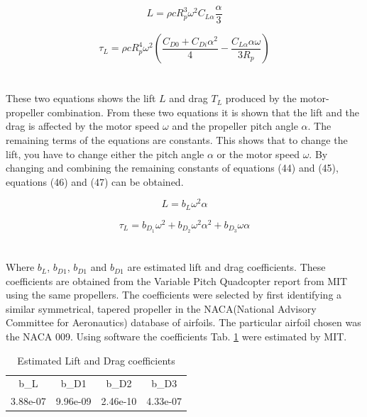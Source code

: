 \begin{equation}
    L = \rho cR_p^3\omega^2C_{L\alpha}\frac{\alpha}{3}
\end{equation}

\begin{equation}
    \tau_L =  \rho cR_p^4\omega^2\left(\frac{C_{D0} + C_{Di}\alpha^2}{4} - \frac{C_{L\alpha}\alpha\omega}{3R_p}\right)
\end{equation}
\\\\
These two equations shows the lift $L$ and drag $T_L$ produced by the motor-propeller combination. From these two equations it is shown that the lift and the drag is affected by the motor speed $\omega$ and the propeller pitch angle $\alpha$. The remaining terms of the equations are constants. This shows that to change the lift, you have to change either the pitch angle $\alpha$ or the motor speed $\omega$. By changing and combining the remaining constants of equations (44) and (45), equations (46) and (47) can be obtained. 

\begin{equation}
    L = b_L\omega^2\alpha
\end{equation}

\begin{equation}
    \tau_L = b_{D_1}\omega^2 + b_{D_2}\omega^2\alpha^2 + b_{D_3}\omega\alpha
\end{equation}
\\\\
Where $b_L$, $b_{D1}$, $b_{D1}$ and $b_{D1}$ are estimated lift and drag coefficients. These coefficients are obtained from the Variable Pitch Quadcopter report from MIT \cite{MITvpp} using the same propellers. The coefficients were selected by first identifying a similar symmetrical, tapered propeller in the NACA(National Advisory Committee for Aeronautics) database of airfoils. The particular airfoil chosen was the NACA 009. Using software the coefficients Tab. \ref{tab:EsLiDrCo} were estimated by MIT.

\begin{table}[H]
\caption{Estimated Lift and Drag coefficients}
\label{tab:EsLiDrCo}
\centering
\begin{tabular}{ c c c c} 
 \hline
 b_L & b_{D1} & b_{D2} & b_{D3}\\
 3.88e-07 & 9.96e-09 & 2.46e-10 & 4.33e-07 \\
 \hline
\end{tabular}
\end{table}

